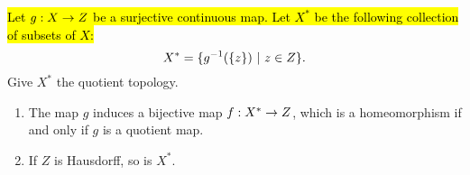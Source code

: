 \vs

\begin{thm}
\hl{Let $g:X\rightarrow Z$ be a surjective continuous map. Let $X^*$ be the following collection of subsets of $X$:}
\[X^* = \{g^{-1}(\{z\})\ |\ z\in Z\}.\]
Give $X^*$ the quotient topology.
\begin{enumerate}
    \item The map $g$ induces a bijective map $f:X^* \rightarrow Z$, which is a homeomorphism if and only if $g$ is a quotient map.
        \begin{center}
        \end{center}
    \item If $Z$ is Hausdorff, so is $X^*$.
\end{enumerate}


\end{thm}














